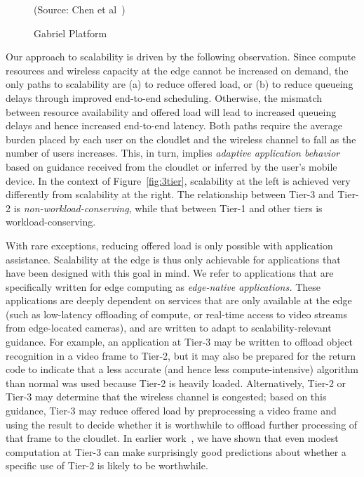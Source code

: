 \begin{figure}
\begin{minipage}[b]{2.5in}
\begin{captiontext}
{\rm (Source: Chen et al~\cite{chen2017empirical})}
\end{captiontext}
\vspace{-0.1in}
\caption{\small Gabriel Platform}
\label{fig:gabriel}
\vspace{0.5in}
\end{minipage}
\vspace{-0.1in}
\end{figure}

Our approach to scalability is driven by the following observation.
Since compute resources and wireless capacity at the edge cannot be
increased on demand, the only paths to scalability are (a) to reduce
offered load, or (b) to reduce queueing delays through improved
end-to-end scheduling.  Otherwise, the mismatch between resource
availability and offered load will lead to increased queueing delays
and hence increased end-to-end latency.  Both paths require the
average burden placed by each user on the cloudlet and the wireless
channel to fall as the number of users increases.  This, in turn,
implies {\em adaptive application behavior} based on guidance received
from the cloudlet or inferred by the user's mobile device.  In the
context of Figure~\ref{fig:3tier}, scalability at the left is achieved
very differently from scalability at the right.  The relationship
between Tier-3 and Tier-2 is {\em non-workload-conserving}, while that
between Tier-1 and other tiers is workload-conserving.

With rare exceptions, reducing offered load is only possible with
application assistance.  Scalability at the edge is thus only
achievable for applications that have been designed with this goal in
mind.  We refer to applications that are specifically written for edge
computing as {\em edge-native applications.}  These applications are
deeply dependent on services that are only available at the edge (such
as low-latency offloading of compute, or real-time access to video
streams from edge-located cameras), and are written to adapt to
scalability-relevant guidance.  For example, an application at Tier-3
may be written to offload object recognition in a video frame to
Tier-2, but it may also be prepared for the return code to indicate
that a less accurate (and hence less compute-intensive) algorithm than
normal was used because Tier-2 is heavily loaded.  Alternatively,
Tier-2 or Tier-3 may determine that the wireless channel is congested;
based on this guidance, Tier-3 may reduce offered load by
preprocessing a video frame and using the result to decide whether it
is worthwhile to offload further processing of that frame to the
cloudlet.  In earlier work~\cite{Hu2015}, we have shown that even
modest computation at Tier-3 can make surprisingly good predictions
about whether a specific use of Tier-2 is likely to be worthwhile.

